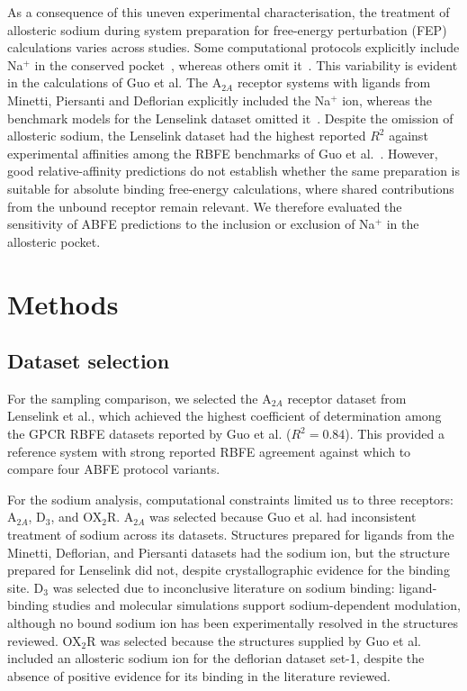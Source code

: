 As a consequence of this uneven experimental characterisation, the treatment of allosteric sodium during system preparation for free-energy perturbation (FEP) calculations varies across studies. Some computational protocols explicitly include Na$^{+}$ in the conserved pocket~\cite{deflorian2020accurate,lenselink2016predicting}, whereas others omit it~\cite{matricon2017fragment}. This variability is evident in the calculations of Guo et al. The A$_{2A}$ receptor systems with ligands from Minetti, Piersanti and Deflorian explicitly included the Na$^{+}$ ion, whereas the benchmark models for the Lenselink dataset omitted it~\cite{guo2023benchmark,anand2026improving}. Despite the omission of allosteric sodium, the Lenselink dataset had the highest reported $R^2$ against experimental affinities among the RBFE benchmarks of Guo et al.~\cite{guo2023benchmark}. However, good relative-affinity predictions do not establish whether the same preparation is suitable for absolute binding free-energy calculations, where shared contributions from the unbound receptor remain relevant. We therefore evaluated the sensitivity of ABFE predictions to the inclusion or exclusion of Na$^{+}$ in the allosteric pocket.

\section{Methods}

\subsection{Dataset selection}

For the sampling comparison, we selected the A$_{2A}$ receptor dataset from Lenselink et al., which achieved the highest coefficient of determination among the GPCR RBFE datasets reported by Guo et al. ($R^2 = 0.84$). This provided a reference system with strong reported RBFE agreement against which to compare four ABFE protocol variants.

For the sodium analysis, computational constraints limited us to three receptors: A$_{2A}$, D$_3$, and OX$_2$R. A$_{2A}$ was selected because Guo et al. had inconsistent treatment of sodium across its datasets. Structures prepared for ligands from the Minetti, Deflorian, and Piersanti datasets had the sodium ion, but the structure prepared for Lenselink did not, despite crystallographic evidence for the binding site. D$_3$ was selected due to inconclusive literature on sodium binding: ligand-binding studies and molecular simulations support sodium-dependent modulation, although no bound sodium ion has been experimentally resolved in the structures reviewed. OX$_2$R was selected because the structures supplied by Guo et al. included an allosteric sodium ion for the deflorian dataset set-1, despite the absence of positive evidence for its binding in the literature reviewed.

